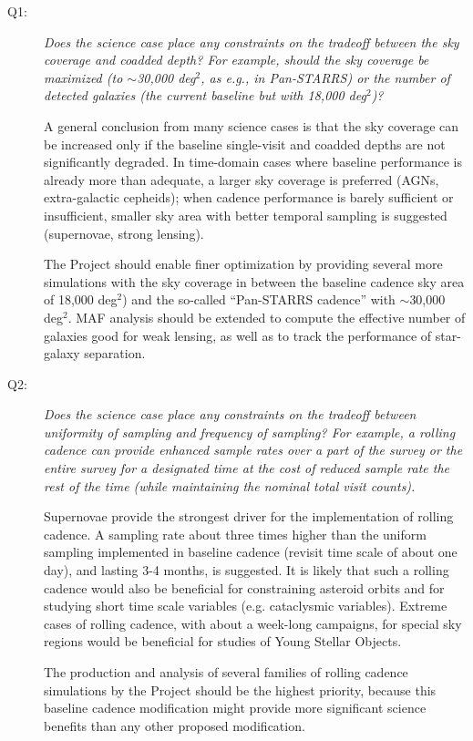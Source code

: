 \begin{description}

\item[Q1:] {\it Does the science case place any constraints on the
tradeoff between the sky coverage and coadded depth? For example, should
the sky coverage be maximized (to $\sim$30,000 deg$^2$, as e.g., in
Pan-STARRS) or the number of detected galaxies (the current baseline but
with 18,000 deg$^2$)?}

A general conclusion from many science cases is that the sky coverage
can be increased only if the baseline single-visit and coadded depths
are not significantly degraded. In time-domain cases where baseline
performance is already more than adequate, a larger sky coverage is
preferred (AGNs, extra-galactic cepheids); when cadence performance is
barely sufficient or insufficient, smaller sky area with better temporal
sampling is suggested (supernovae, strong lensing).

The Project should enable finer optimization by providing several more
simulations with the sky coverage in between the baseline cadence sky
area of 18,000 deg$^2$) and the so-called ``Pan-STARRS cadence'' with
$\sim$30,000 deg$^2$. MAF analysis should be extended to compute the
effective number of galaxies good for weak lensing, as well as to track
the performance of star-galaxy separation.


\item[Q2:] {\it Does the science case place any constraints on the
tradeoff between uniformity of sampling and frequency of  sampling? For
example, a rolling cadence can provide enhanced sample rates over a part
of the survey or the entire survey for a designated time at the cost of
reduced sample rate the rest of the time (while maintaining the nominal
total visit counts).}

Supernovae provide the strongest driver for the implementation of
rolling cadence. A sampling rate about three times higher than the
uniform sampling implemented in baseline cadence (revisit time scale of
about one day), and lasting 3-4 months, is suggested. It is likely that
such a rolling cadence would also be beneficial for constraining
asteroid orbits and for studying short time scale variables (e.g.
cataclysmic variables). Extreme cases of rolling cadence, with about a
week-long campaigns, for special sky regions would be beneficial for
studies of Young Stellar Objects.

The production and analysis of several families of rolling cadence
simulations by the Project should be the highest priority, because this
baseline cadence modification might provide more significant science
benefits than any other proposed modification.



\end{description}
